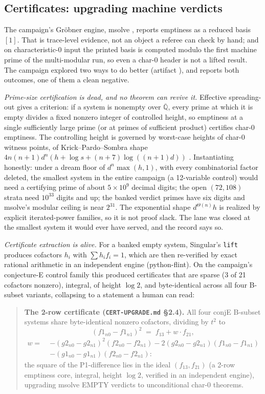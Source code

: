 \documentclass[11pt]{article}
\theoremstyle{definition}
\theoremstyle{remark}
\begin{document}
\subsection{Certificates: upgrading machine verdicts}\label{sec:cert}

The campaign's Gr\"obner engine, msolve \cite{msolve}, reports emptiness as a reduced basis $[1]$. That is trace-level evidence, not an object a referee can check by hand; and on characteristic-$0$ input the printed basis is computed modulo the first machine prime of the multi-modular run, so even a char-$0$ header is not a lifted result. The campaign explored two ways to do better (artifact ), and reports both outcomes, one of them a clean negative.

\emph{Prime-size certification is dead, and no theorem can revive it.} Effective spreading-out gives a criterion: if a system is nonempty over $\overline{\mathbb{Q}}$, every prime at which it is empty divides a fixed nonzero integer of controlled height, so emptiness at a single sufficiently large prime (or at primes of sufficient product) certifies char-$0$ emptiness. The controlling height is governed by worst-case heights of char-$0$ witness points, of Krick--Pardo--Sombra shape $4n(n+1)d^n(h+\log s+(n+7)\log((n+1)d))$ \cite{KPS}. Instantiating honestly: under a dream floor of $d^n\max(h,1)$, with every combinatorial factor deleted, the smallest system in the entire campaign (a 12-variable control) would need a certifying prime of about $5\times10^9$ decimal digits; the open $(72,108)$ strata need $10^{33}$ digits and up; the banked verdict primes have six digits and msolve's modular ceiling is near $2^{31}$. The exponential shape $d^{\Theta(n)}h$ is realized by explicit iterated-power families, so it is not proof slack. The lane was closed at the smallest system it would ever have served, and the record says so.

\emph{Certificate extraction is alive.} For a banked empty system, Singular's \texttt{lift} \cite{Singular} produces cofactors $h_i$ with $\sum h_if_i=1$, which are then re-verified by exact rational arithmetic in an independent engine (python-flint). On the campaign's conjecture-E control family this produced certificates that are sparse (3 of 21 cofactors nonzero), integral, of height $\log 2$, and byte-identical across all four B-subset variants, collapsing to a statement a human can read:

\begin{quote}
\textbf{The 2-row certificate (\texttt{CERT-UPGRADE.md} \S2.4).} All four conjE B-subset systems share byte-identical nonzero cofactors, dividing by $t^2$ to
\[
(f1_{n0}-f1_{n1})^2\;=\;f_{13}+w\cdot f_{21},
\]
\[
\begin{aligned}
w=\;&-(g2_{n0}-g2_{n1})^2(f2_{n0}-f2_{n1})-2(g2_{n0}-g2_{n1})(f1_{n0}-f1_{n1})\\
&-(g1_{n0}-g1_{n1})(f2_{n0}-f2_{n1}):
\end{aligned}
\]
the square of the P1-difference lies in the ideal $(f_{13},f_{21})$ (a 2-row emptiness core, integral, height $\log 2$, verified in an independent engine), upgrading msolve EMPTY verdicts to unconditional char-0 theorems.
\end{quote}
\end{document}
